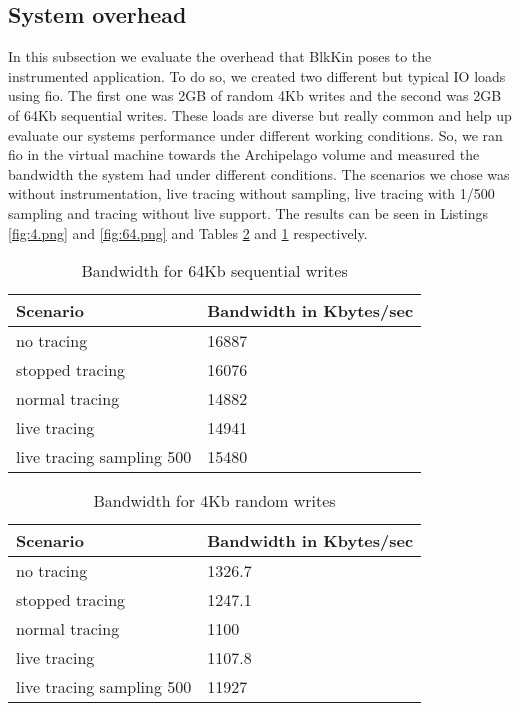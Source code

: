 \subsection{System overhead}
In this subsection we evaluate the overhead that BlkKin poses to the
instrumented application. To do so, we created two different but typical IO
loads using fio. The first one was 2GB of random 4Kb writes and the second was
2GB of 64Kb sequential writes. These loads are diverse but really common and
help up evaluate our systems performance under different working conditions.
So, we ran fio in the virtual machine towards the Archipelago volume and
measured the bandwidth the system had under different conditions. The scenarios
we chose was without instrumentation, live tracing without sampling, live
tracing with 1/500 sampling and tracing without live support. The results can
be seen in Listings \ref{fig:4.png} and \ref{fig:64.png} and Tables
\ref{tab:4k-random} and \ref{tab:64k-sequential} respectively.


\begin{table}[H]
    \centering
    \begin{tabular}{ | l | l | }
        \hline
        Scenario  & Bandwidth in Kbytes/sec  \\ \hline \hline
        no tracing & 16887  \\ \hline
        stopped tracing & 16076 \\ \hline
        normal tracing & 14882  \\ \hline
        live tracing & 14941  \\ \hline
        live tracing sampling 500 & 15480  \\ \hline
    \end{tabular}
    \caption{Bandwidth for 64Kb sequential writes}
    \label{tab:64k-sequential}
\end{table}

\begin{table}[H]
    \centering
    \begin{tabular}{ | l | l | }
        \hline
        Scenario  & Bandwidth in Kbytes/sec  \\ \hline \hline
        no tracing & 1326.7  \\ \hline
        stopped tracing & 1247.1 \\ \hline
        normal tracing & 1100 \\ \hline
        live tracing & 1107.8  \\ \hline
        live tracing sampling 500 & 11927  \\ \hline
    \end{tabular}
    \caption{Bandwidth for 4Kb random writes}
    \label{tab:4k-random}
\end{table}

